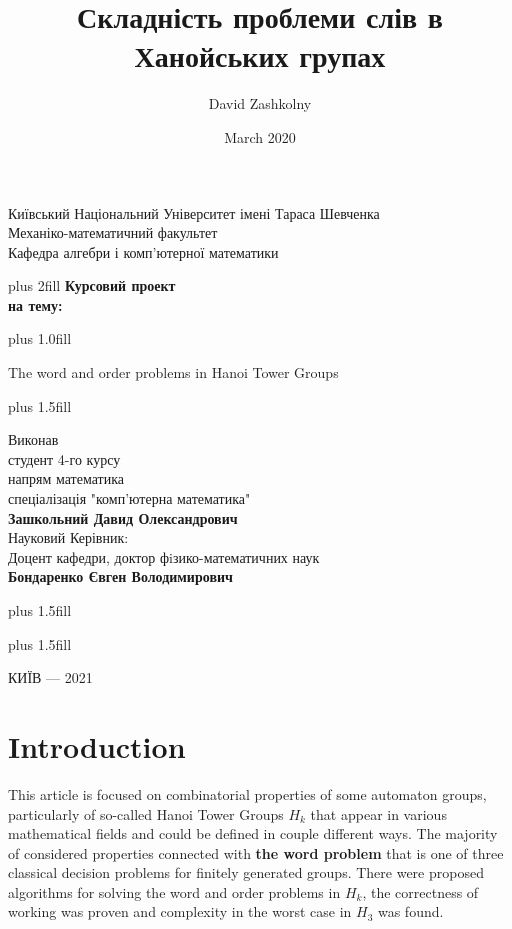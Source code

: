 \documentclass[a4paper,12pt]{amsart}
\title{ 	Складність проблеми слів в Ханойських групах }
\author{ David Zashkolny }
\date{March 2020}
\begin{document}
\thispagestyle {empty}
\begin{center}
	\large  Київський Національний Університет імені Тараса Шевченка \\
	Механіко-математичний факультет \\
	Кафедра алгебри і комп'ютерної математики \par
\end{center}


\begin{center}
	\vskip0cm plus 2fill
	\vspace{2.5cm} {\bf Курсовий проект}\\

	{\bf на тему:}\\
\end{center}


\vskip0cm plus 1.0fill



\begin{center}\bf
	{\LARGE
		The word and order problems in Hanoi Tower Groups \par}
\end{center}

\vskip0cm plus 1.5fill

\hangindent=7cm  \noindent
Виконав\\
студент 4-го курсу\\
напрям математика\\
спеціалізація "комп'ютерна математика"\\
{\bf Зашкольний Давид Олександрович}\\[2cm]
Науковий Керівник:\\
Доцент кафедри, доктор фiзико-математичних наук\\
{\bf Бондаренко Євген Володимирович}


\vskip0cm plus 1.5fill

\vskip5cm plus 1.5fill
\begin{center}
	КИЇВ --- 2021
\end{center}

\newpage
{}

\tableofcontents

\newpage

\section{Introduction}
This article is focused on combinatorial properties of some automaton groups, particularly of so-called Hanoi Tower Groups $H_k$ that appear in various mathematical fields and could be defined in couple different ways. The majority of considered properties connected with \textbf{the word problem} that is one of three classical decision problems for finitely generated groups. There were proposed algorithms for solving the word and order problems in $H_k$, the correctness of working was proven and complexity in the worst case in $H_3$ was found.
\end{document}
